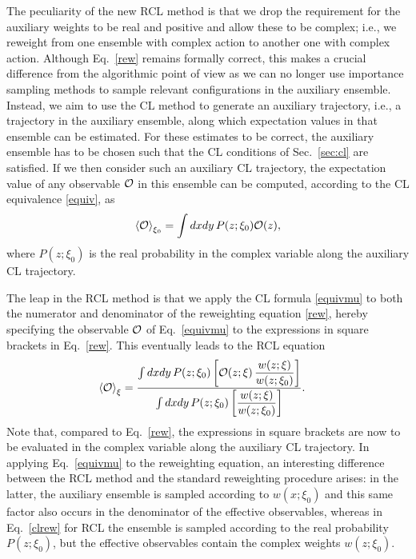 \documentclass[prd,showpacs,reprint,nofootinbib,showkeys]{revtex4-1}
\newcommand{\Obs}{{\cal O}}
\begin{document}
The peculiarity of the new RCL method is that we drop the requirement for the auxiliary weights to be real and positive and allow these to be complex; i.e., we reweight from one ensemble with complex action to another one with complex action. Although Eq.\ \eqref{rew} remains formally correct, this makes a crucial difference from the algorithmic point of view as we can no longer use importance sampling methods to sample relevant configurations in the auxiliary ensemble. Instead, we aim to use the CL method to generate an auxiliary trajectory, i.e., a trajectory in the auxiliary ensemble, along which expectation values in that ensemble can be estimated. For these estimates to be correct, the auxiliary ensemble has to be chosen such that the CL conditions of Sec.~\ref{sec:cl} are satisfied. If we then consider such an auxiliary CL trajectory, the expectation value of any observable $\Obs$ in this ensemble can be computed, according to the CL equivalence \eqref{equiv}, as
\begin{align}
\braket{\Obs}_{\xi_0} = \int dx dy \, P(z;\xi_0) \Obs(z) ,
\label{equivmu}
\end{align}
where $P(z;\xi_0)$ is the real probability in the complex variable along the auxiliary CL trajectory. 

The leap in the RCL method is that we apply the CL formula \eqref{equivmu} to both the numerator and denominator of the reweighting equation \eqref{rew}, hereby specifying the observable $\Obs$ of Eq.~\eqref{equivmu} to the expressions in square brackets in Eq.~\eqref{rew}. This eventually leads to the RCL equation
\begin{align}
\braket{\Obs}_{\xi} 
&= \frac{\int dx dy \, P(z;\xi_0) \left[\Obs(z;\xi)\,\dfrac{w(z;\xi)}{w(z;\xi_0)}\right]}{\int dx dy \, P(z;\xi_0) \left[\dfrac{w(z;\xi)}{w(z;\xi_0)}\right]} .
\label{clrew}
\end{align}
Note that, compared to Eq.\ \eqref{rew}, the expressions in square brackets are now to be evaluated in the complex variable along the auxiliary CL trajectory. In applying Eq.~\eqref{equivmu} to the reweighting equation, an interesting difference between the RCL method and the standard reweighting procedure arises: in the latter, the auxiliary ensemble is sampled according to $w(x;\xi_0)$ and this same factor also occurs in the denominator of the effective observables, whereas in Eq.\ \eqref{clrew} for RCL the ensemble is sampled according to the real probability $P(z;\xi_0)$, but the effective observables contain the complex weights $w(z;\xi_0)$.
\end{document}
